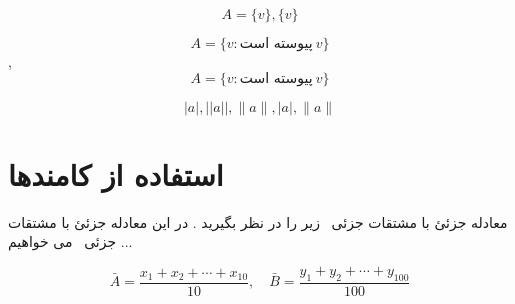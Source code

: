 \documentclass[12pt]{article}
\newcommand{\pde}{معادله جزئئ با مشتقات جزئی \ }
\newcommand{\mian}[2]{\frac{#1_1 + #1_2 + \cdots + #1_{#2}}{#2}}
\begin{document}
\[
A = \lbrace v \rbrace, \{ v \}
\]

\[
A = \lbrace v : \text{پیوسته است} \ v \rbrace
\],\quad 
\[
A = \lbrace v \colon \text{پیوسته است} \ v \rbrace
\]

\[
|a| , ||a||,\| a \| , \lvert a \rvert, \lVert a \rVert
\]

\section{استفاده از کامندها}

\pde زیر را در نظر بگیرید
. در این \pde می خواهیم ...

\[
\bar{A} = \mian{x}{10} , \quad \bar{B} = \mian{y}{100}
\]
\end{document}
